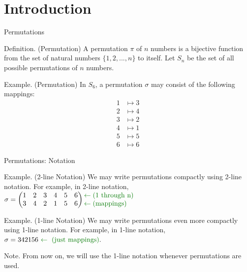 \documentclass[aspectratio=169, serif]{beamer}
\begin{document}
\section{Introduction}
\begin{frame}{Permutations}
\begin{block}{Definition. (Permutation)}
A permutation $\pi$ of $n$ numbers is a bijective function from the set of natural numbers $\{1,2,...,n\}$ to itself.
Let $S_n$ be the set of all possible permutations of $n$ numbers.
\end{block}
\begin{exampleblock}{Example. (Permutation)}
In $S_6$, a permutation $\sigma$ may consist of the following mappings:
\begin{align*}
1&\mapsto 3\\[-.5em]
2&\mapsto 4\\[-.5em]
3&\mapsto 2\\[-.5em]
4&\mapsto 1\\[-.5em]
5&\mapsto 5\\[-.5em]
6&\mapsto 6
\end{align*}
\end{exampleblock}
\end{frame}
\begin{frame}{Permutations: Notation}
\small
    \begin{exampleblock}{Example. (2-line Notation)} We may write permutations compactly using 2-line notation. For example, in 2-line notation,
    \centering
$\sigma = \begin{pmatrix}1&2&3&4&5&6\\3&4&2&1&5&6\end{pmatrix}\begin{matrix*}[l]{\color{forGreen} \leftarrow\text{(1 through n)}}\\ {\color{forGreen}\leftarrow \text{(mappings)}} \end{matrix*}$
\end{exampleblock}
\begin{exampleblock}{Example. (1-line Notation)}
We may write permutations even more compactly using 1-line notation. For example, in 1-line notation, $\sigma = 342156{\color{forGreen}~\leftarrow\text{ (just mappings)}}.$
\end{exampleblock}
\begin{block}{Note.}
From now on, we will use the 1-line notation whenever permutations are used.
\end{block}
\end{frame}
\end{document}
